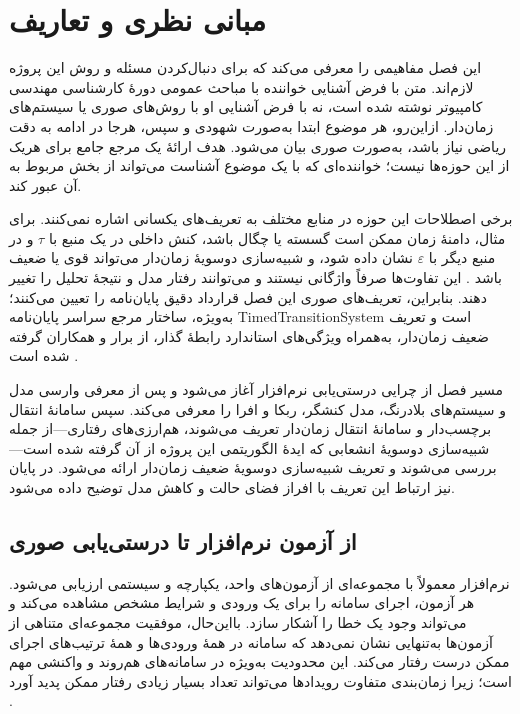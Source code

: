 \chapter{مبانی نظری و تعاریف}
\label{chap:background}

این فصل مفاهیمی را معرفی می‌کند که برای دنبال‌کردن مسئله و روش این پروژه لازم‌اند. متن با فرض آشنایی خواننده با مباحث عمومی دورهٔ کارشناسی مهندسی کامپیوتر نوشته شده است، نه با فرض آشنایی او با روش‌های صوری یا سیستم‌های زمان‌دار. ازاین‌رو، هر موضوع ابتدا به‌صورت شهودی و سپس، هرجا در ادامه به دقت ریاضی نیاز باشد، به‌صورت صوری بیان می‌شود. هدف ارائهٔ یک مرجع جامع برای هریک از این حوزه‌ها نیست؛ خواننده‌ای که با یک موضوع آشناست می‌تواند از بخش مربوط به آن عبور کند.

برخی اصطلاحات این حوزه در منابع مختلف به تعریف‌های یکسانی اشاره نمی‌کنند. برای مثال، دامنهٔ زمان ممکن است گسسته یا چگال باشد، کنش داخلی در یک منبع با $\tau$ و در منبع دیگر با $\varepsilon$ نشان داده شود، و شبیه‌سازی دوسویهٔ زمان‌دار می‌تواند قوی یا ضعیف باشد \cite{AlurDill1990,BerardEtAl2008,LiebEtAl2025,ReynierSangnier2009}. این تفاوت‌ها صرفاً واژگانی نیستند و می‌توانند رفتار مدل و نتیجهٔ تحلیل را تغییر دهند. بنابراین، تعریف‌های صوری این فصل قرارداد دقیق پایان‌نامه را تعیین می‌کنند؛ به‌ویژه، ساختار مرجع سراسر پایان‌نامه \gls{TimedTransitionSystem} است و تعریف ضعیف زمان‌دار، به‌همراه ویژگی‌های استاندارد رابطهٔ گذار، از برار و همکاران گرفته شده است \cite{BerardEtAl2008}.

مسیر فصل از چرایی درستی‌یابی نرم‌افزار آغاز می‌شود و پس از معرفی وارسی مدل و سیستم‌های بلادرنگ، مدل کنشگر، ربکا و افرا را معرفی می‌کند. سپس سامانهٔ انتقال برچسب‌دار و سامانهٔ انتقال زمان‌دار تعریف می‌شوند، هم‌ارزی‌های رفتاری—از جمله شبیه‌سازی دوسویهٔ انشعابی که ایدهٔ الگوریتمی این پروژه از آن گرفته شده است—بررسی می‌شوند و تعریف شبیه‌سازی دوسویهٔ ضعیف زمان‌دار ارائه می‌شود. در پایان نیز ارتباط این تعریف با افراز فضای حالت و کاهش مدل توضیح داده می‌شود.

\section{از آزمون نرم‌افزار تا درستی‌یابی صوری}

نرم‌افزار معمولاً با مجموعه‌ای از آزمون‌های واحد، یکپارچه و سیستمی ارزیابی می‌شود. هر آزمون، اجرای سامانه را برای یک ورودی و شرایط مشخص مشاهده می‌کند و می‌تواند وجود یک خطا را آشکار سازد. بااین‌حال، موفقیت مجموعه‌ای متناهی از آزمون‌ها به‌تنهایی نشان نمی‌دهد که سامانه در همهٔ ورودی‌ها و همهٔ ترتیب‌های اجرای ممکن درست رفتار می‌کند. این محدودیت به‌ویژه در سامانه‌های هم‌روند و واکنشی مهم است؛ زیرا زمان‌بندی متفاوت رویدادها می‌تواند تعداد بسیار زیادی رفتار ممکن پدید آورد \cite{BaierKatoen2008}.

